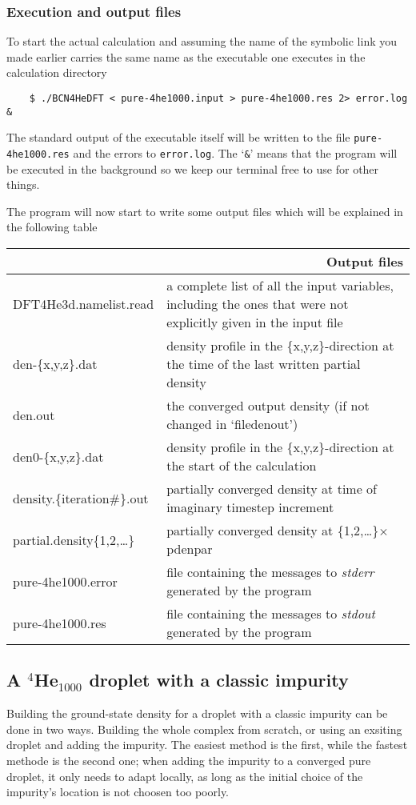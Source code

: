 \documentclass[10pt,a4paper]{article}
\begin{document}
	\subsubsection{Execution and output files}
	To start the actual calculation and assuming the name of the symbolic link you made earlier carries the same name as the executable one executes in the calculation directory
	\begin{verbatim}
	$ ./BCN4HeDFT < pure-4he1000.input > pure-4he1000.res 2> error.log &
	\end{verbatim}
	The standard output of the executable itself will be written to the file \newline \verb|pure-4he1000.res| and the errors to \verb|error.log|. The `\verb|&|' means that the program will be executed in the background so we keep our terminal free to use for other things.
	
	The program will now start to write some output files which will be explained in the following table
	\begin{center}
	\begin{tabular}{l|p{7.5cm}}
		\multicolumn{2}{r}{\textbf{Output files}} \\
		\hline\hline
		DFT4He3d.namelist.read			& a complete list of all the input variables, including the ones that were not explicitly given in the input file \\
		\hline
		den-\{x,y,z\}.dat				& density profile in the \{x,y,z\}-direction at the time of the last written partial density \\
		\hline
		den.out							& the converged output density (if not changed in `filedenout') \\
		\hline
		den0-\{x,y,z\}.dat				& density profile in the \{x,y,z\}-direction at the start of the calculation \\
		\hline
		density.\{iteration\#\}.out	& partially converged density at time of imaginary timestep increment \\
		\hline
		partial.density\{1,2,\ldots\}	& partially converged density at \{1,2,\ldots\}$\times$pdenpar \\
		\hline
		pure-4he1000.error				& file containing the messages to \emph{stderr} generated by the program \\
		\hline
		pure-4he1000.res				& file containing the messages to \emph{stdout} generated by the program
	\end{tabular}
	\end{center}
	
	\subsection{A $^4$He$_{1000}$ droplet with a classic impurity}
	Building the ground-state density for a droplet with a classic impurity can be done in two ways. Building the whole complex from scratch, or using an exsiting droplet and adding the impurity. The easiest method is the first, while the fastest methode is the second one; when adding the impurity to a converged pure droplet, it only needs to adapt locally, as long as the initial choice of the impurity's location is not choosen too poorly.
	
\end{document}
